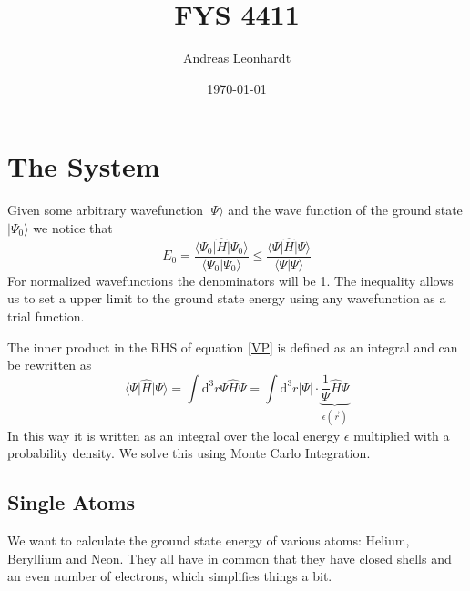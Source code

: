 \documentclass[a4paper,10pt]{article}
\title{FYS 4411 }
\author{Andreas Leonhardt}
\date{\today}
\newcommand{\ud}{\mathrm{d}}
\newcommand{\bra}[1]{\big\langle #1 \big|}
\newcommand{\ket}[1]{\big| #1 \big\rangle}
\newcommand{\braket}[2]{\big\langle #1 \big| #2 \big\rangle}
\begin{document}
\maketitle

\tableofcontents


\section{The System}

Given some arbitrary wavefunction $\ket{\Psi}$ and the wave function of the ground state $\ket{\Psi_0}$ we notice that
\begin{equation}
 E_0 = \frac{\bra{\Psi_0}\hat{H}\ket{\Psi_0}}{\braket{\Psi_0}{\Psi_0}} \le \frac{\bra{\Psi}\hat{H}\ket{\Psi}}{\braket{\Psi}{\Psi}} \label{VP}
\end{equation}
For normalized wavefunctions the denominators will be 1. 
The inequality allows us to set a upper limit to the ground state energy using any wavefunction as a trial function. 


The inner product in the RHS of equation \ref{VP} is defined as an integral and can be rewritten as
\begin{equation}
\bra{\Psi} \hat H \ket {\Psi} = \int \ud^3 r  \Psi \hat{H} \Psi = \int \ud^3 r |\Psi|\cdot \underbrace{\frac{1}{\Psi} \hat H \Psi }_{\epsilon(\vec{r})}
\end{equation}
In this way it is written as an integral over the local energy $\epsilon$ multiplied with a probability density. We solve this using Monte Carlo Integration. 

\subsection{ Single Atoms}

We want to calculate the ground state energy of various atoms: Helium, Beryllium and Neon. 
They all have in common that they have closed shells and an even number of electrons, which simplifies things a bit.
\end{document}
